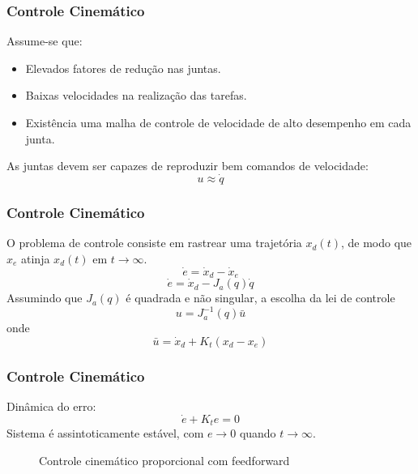 \documentclass{beamer}
\begin{document}
\begin{frame}
\frametitle{Controle Cinemático}
Assume-se que:
\begin{itemize}
\item Elevados fatores de redução nas juntas.
\item Baixas velocidades na realização das tarefas.
\item Existência uma malha de controle de velocidade de alto desempenho em cada junta.
\end{itemize}
As juntas devem ser capazes de reproduzir bem comandos de velocidade:
\[ {u} \approx \dot{{q}}\]
\end{frame}

\begin{frame}
\frametitle{Controle Cinemático}
O problema de controle consiste em rastrear uma trajetória ${x}_d(t)$, de modo que  ${x}_e$ atinja ${x}_d(t)$ em $t \to \infty$.
\begin{equation}
{\dot{e}} = {\dot{x}}_d - {\dot{x}_e}
\end{equation}
\begin{equation}
{\dot{e}} = {\dot{x}}_d - {J}_a({q})\dot{{q}}
\end{equation}
Assumindo que ${J}_a({q})$ é quadrada e não singular, a escolha da lei de controle
\begin{equation}
{u} = {J}_a^{-1}({q})\bar{{u}}
\end{equation}
onde
\begin{equation}
\bar{{u}} = \dot{{x}}_d + {K_t} ({x}_d - {x}_e)
\end{equation}
\end{frame}

\begin{frame}
\frametitle{Controle Cinemático}
Dinâmica do erro:
\begin{equation}
\dot{{e}} + {K_t} {e} = 0
\end{equation}
Sistema é assintoticamente estável, com $e \rightarrow 0$ quando $t \to \infty$.
\begin{figure}[h!]
\centering {}
\caption{Controle cinemático proporcional com feedforward}
\label{fig:controlecinematico}
\end{figure}
\end{frame}
\end{document}
